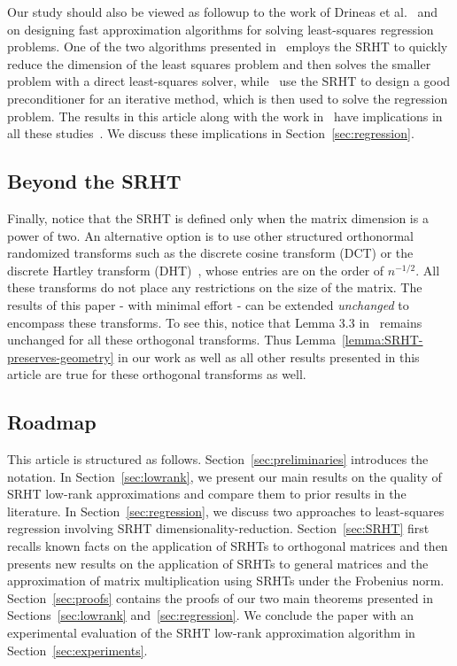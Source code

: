 
Our study should also be viewed as followup to the work of Drineas et al.~\cite{DMMS11}  and~\cite{RT08,AMT10}
on designing fast approximation algorithms for solving least-squares regression problems.
One of the two algorithms presented in~\cite{DMMS11} employs the SRHT
to quickly reduce the dimension of the least squares problem and then solves the smaller problem with a direct least-squares solver,
while~\cite{RT08,AMT10} use the SRHT to design
a good preconditioner for an iterative method, which is then used to solve the regression problem. The results in this article along with
the work in~\cite{Tro11} have implications in all these studies~\cite{RT08,DMMS11,AMT10}. We discuss these implications in Section~\ref{sec:regression}.

\subsection{Beyond the SRHT}
Finally, notice that the SRHT is defined only when the matrix dimension is a power of two.
An alternative option is to use other structured orthonormal randomized transforms such as the
discrete cosine transform (DCT) or the discrete Hartley transform (DHT)~\cite{WLRT07,NDT09,RT08,AMT10}, whose entries are on the order of $n^{-1/2}.$
All these transforms do not place any restrictions on the size of the matrix. The results of this paper - with minimal effort -
can be extended \emph{unchanged} to encompass these transforms. To see this, notice that Lemma 3.3 in~\cite{Tro11} remains unchanged for all these orthogonal transforms.
Thus Lemma~\ref{lemma:SRHT-preserves-geometry} in our work as well as all other results presented in this article are true for these orthogonal transforms as well.

\subsection{Roadmap} This article is structured as follows. Section~\ref{sec:preliminaries} introduces the notation.
In Section~\ref{sec:lowrank}, we present our main results on the quality of SRHT low-rank approximations and compare them to prior results in the literature. In Section~\ref{sec:regression}, we discuss two approaches to least-squares regression involving SRHT dimensionality-reduction.
Section~\ref{sec:SRHT} first recalls known facts on the application of SRHTs to orthogonal matrices and then presents new results on the application of SRHTs to general matrices and the approximation of matrix multiplication using SRHTs under the Frobenius norm. Section~\ref{sec:proofs} contains the proofs of our two main theorems presented in Sections~\ref{sec:lowrank} and~\ref{sec:regression}.
We conclude the paper with an experimental evaluation of the SRHT low-rank approximation algorithm in Section~\ref{sec:experiments}.

